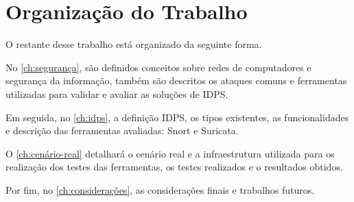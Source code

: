 \section{Organização do Trabalho} \label{sec:organização-do-trabalho}

O restante desse trabalho está organizado da seguinte forma.

No \autoref{ch:segurança}, são definidos conceitos sobre redes de computadores e segurança da informação, também são descritos os ataques comuns e ferramentas utilizadas para validar e avaliar as soluções de IDPS.

Em seguida, no \autoref{ch:idps}, a definição IDPS, os tipos existentes, as funcionalidades e descrição das ferramentas avaliadas: Snort e Suricata.

O \autoref{ch:cenário-real} detalhará o cenário real e a infraestrutura utilizada para os realização dos testes das ferramentas, os testes realizados e o resultados obtidos.

Por fim, no \autoref{ch:considerações}, as considerações finais e trabalhos futuros.
